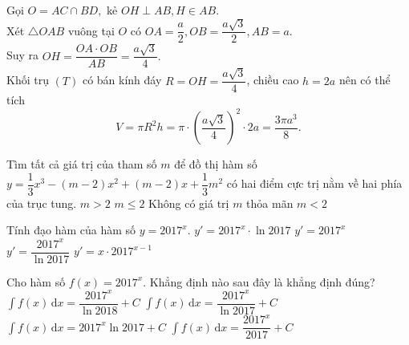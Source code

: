\begin{ex}
{\begin{center}
\end{center}
Gọi $O=AC \cap BD,$ kẻ $OH \perp AB, H\in AB.$\\
Xét $\triangle OAB$ vuông tại $O$ có $OA=\dfrac{a}{2},OB=\dfrac{a\sqrt{3}}{2},AB=a.$\\
Suy ra $OH=\dfrac{OA \cdot OB}{AB}=\dfrac{a\sqrt{3}}{4}.$\\
Khối trụ $(T)$ có bán kính đáy $R=OH=\dfrac{a\sqrt{3}}{4}$, chiều cao $h=2a$ nên có thể tích 
$$V=\pi R^2 h=\pi \cdot \left(\dfrac{a\sqrt{3}}{4} \right)^2 \cdot 2a=\dfrac{3\pi a^3}{8}.$$
}

\end{ex} 
 
 
\begin{ex}%
Tìm tất cả giá trị của tham số $m$ để đồ thị hàm số $y=\dfrac{1}{3}x^3-(m-2)x^2+(m-2)x+\dfrac{1}{3}m^2$ có hai điểm cực trị nằm về hai phía của trục tung.
\choice
{$m>2$}
{$m\leq 2$}
{Không có giá trị $m$ thỏa mãn}
{\True $m<2$}

\end{ex} 
 
\begin{ex}%
Tính đạo hàm của hàm số $y=2017^x.$	
\choice
{\True $y'=2017^x \cdot \ln 2017$}
{$y'=2017^x$}
{$y'=\dfrac{2017^x}{\ln 2017}$}
{$y'=x\cdot 2017^{x-1}$}

\end{ex} 
 
\begin{ex}%
Cho hàm số $f(x)=2017^x$. Khẳng định nào sau đây là khẳng định đúng?
\choice
{$\displaystyle\int f(x) \mathrm{\,d}x=\dfrac{2017^x}{\ln 2018}+C$}
{\True $\displaystyle\int f(x) \mathrm{\,d}x=\dfrac{2017^x}{\ln 2017}+C$}
{$\displaystyle\int f(x) \mathrm{\,d}x=2017^x \ln 2017+C$}
{$\displaystyle\int f(x) \mathrm{\,d}x=\dfrac{2017^x}{ 2017}+C$}

\end{ex} 
 
